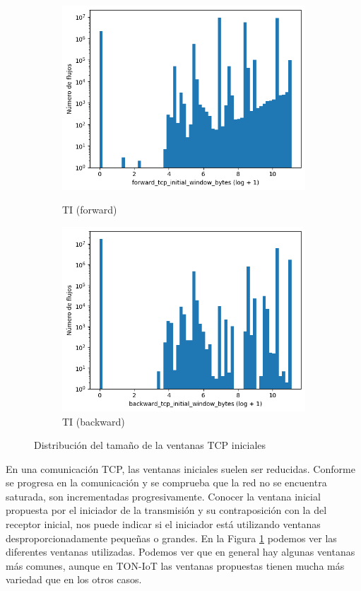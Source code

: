 \begin{figure}[H]
\begin{subfigure}[b]{0.26\textwidth}
        \includegraphics[width=\linewidth]{media/packet_pincer_toniot/forward_tcp_initial_window_bytes_log_x_log_y.png}
        \caption{TI (forward)}
        \includegraphics[width=\linewidth]{media/packet_pincer_toniot/backward_tcp_initial_window_bytes_log_x_log_y.png}
        \caption{TI (backward)}
    \end{subfigure}
       \caption{Distribución del tamaño de la ventanas TCP iniciales}
       \label{fig:packet_pincer_bidirectional_tcp_initial_window_bytes}
\end{figure}

En una comunicación TCP, las ventanas iniciales suelen ser reducidas. Conforme se progresa en la comunicación y se comprueba que la red no se encuentra saturada, son incrementadas progresivamente. Conocer la ventana inicial propuesta por el iniciador de la transmisión y su contraposición con la del receptor inicial, nos puede indicar si el iniciador está utilizando ventanas desproporcionadamente pequeñas o grandes. En la Figura \ref{fig:packet_pincer_bidirectional_tcp_initial_window_bytes} podemos ver las diferentes ventanas utilizadas. Podemos ver que en general hay algunas ventanas más comunes, aunque en TON-IoT las ventanas propuestas tienen mucha más variedad que en los otros casos.

